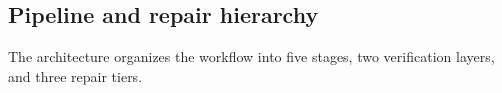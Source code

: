 \documentclass{article}
\begin{document}
\subsection{Pipeline and repair hierarchy}
\label{subsec:pipeline}

The architecture organizes the workflow into five stages, two verification layers, and three repair tiers.







\end{document}
